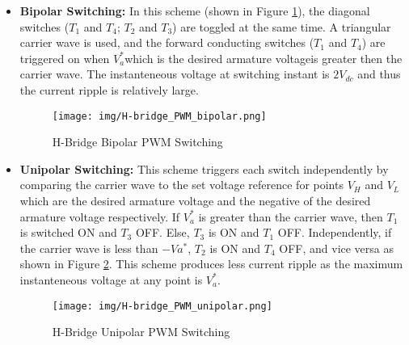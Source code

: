 \documentclass[a4paper]{article}
\begin{document}
\begin{itemize}
        \item \textbf{Bipolar Switching: }In this scheme (shown in Figure \ref{fig:PWM_bipolar}), 
                the diagonal switches ($T_{1}$ and $T_{4}$; $T_{2}$ and $T_{3}$) are toggled at the same time. 
                A triangular carrier wave is used, and the forward conducting switches ($T_{1}$ and $T_{4}$) are triggered 
                on when $V_{a}^{*}$\textemdash which is the desired armature voltage\textemdash is greater then the carrier wave. 
                The instanteneous voltage at switching instant is $2V_{dc}$ and thus the current ripple is relatively large.  

                \begin{figure}
                        \centering
                        \texttt{[image: img/H-bridge\_PWM\_bipolar.png]}
                        \caption{H-Bridge Bipolar PWM Switching \cite{kim17}}
                        \label{fig:PWM_bipolar}
                \end{figure}


        \item \textbf{Unipolar Switching: }This scheme triggers each switch independently by comparing the carrier wave to the 
                set voltage reference for points $V_{H}$ and $V_{L}$ which are the desired armature voltage and the negative of the 
                desired armature voltage respectively. If $V_{a}^{*}$ is greater than the carrier wave, then $T_{1}$ is switched ON 
                and $T_{3}$ OFF. Else, $T_{3}$ is ON and $T_{1}$ OFF. Independently, if  the carrier wave is less than $-V{a}^{*}$, 
                $T_{2}$ is ON and $T_{4}$ OFF, and vice versa as shown in Figure \ref{fig:PWM_unipolar}. 
                This scheme produces less current ripple as the maximum instanteneous voltage at any point is $V_{a}^{*}$.

                \begin{figure}
                        \centering
                        \texttt{[image: img/H-bridge\_PWM\_unipolar.png]}
                        \caption{H-Bridge Unipolar PWM Switching \cite{kim17}}
                        \label{fig:PWM_unipolar}
                \end{figure}


\end{itemize}


\pagebreak


 
\end{document}
